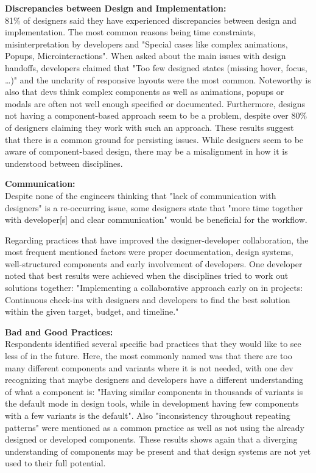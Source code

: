 \textbf{Discrepancies between Design and Implementation:}\\
81\% of designers said they have experienced discrepancies between design and implementation. The
most common reasons being time constraints, misinterpretation by developers and "Special cases like
complex animations, Popups, Microinteractions". When asked about the main issues with design
handoffs, developers claimed that "Too few designed states (missing hover, focus, \dots)" and
the unclarity of responsive layouts were the most common. Noteworthy is also that devs think complex
components as well as animations, popups or modals are often not well enough specified or
documented. Furthermore, designs not having a component-based approach seem to be a problem, despite
over 80\% of designers claiming they work with such an approach.
These results suggest that there is a common ground for persisting issues. While designers seem to
be aware of component-based design, there may be a misalignment in how it is understood between
disciplines.

\textbf{Communication:}\\
Despite none of the engineers thinking that "lack of communication with designers" is a re-occurring
issue, some designers state that "more time together with developer[s] and clear communication"
would be beneficial for the workflow.

Regarding practices that have improved the designer-developer collaboration, the most frequent
mentioned factors were proper documentation, design systems, well-structured components and early
involvement of developers. One developer noted that best results were achieved when the disciplines
tried to work out solutions together:
"Implementing a collaborative approach early on in projects: Continuous check-ins with designers and
developers to find the best solution within the given target, budget, and timeline."

\textbf{Bad and Good Practices:}\\
Respondents identified several specific bad practices that they would like to see less of in the
future. Here, the most commonly named was that there are too many different components and variants
where it is not needed, with one dev recognizing that maybe designers and developers have a
different understanding of what a component is: "Having similar components in thousands of variants
is the default mode in design tools, while in development having few components with a few variants
is the default". Also "inconsistency throughout repeating patterns" were mentioned as a common
practice as well as not using the already designed or developed components. These results shows
again that a diverging understanding of components may be present and that design systems are not
yet used to their full potential.

